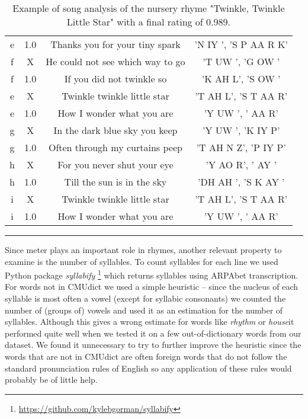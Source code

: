 \begin{table}[h!]
\begin{tabular}{c|c|c|c}
	e  & 1.0  & Thanks you for your tiny spark &  'N IY ', 'S P AA R K' \\
	f  & X    & He could not see which way to go &  'T UW ', 'G OW ' \\
	f  & 1.0  & If you did not twinkle so & 'K AH L', 'S OW ' \\
	e  & X    & Twinkle twinkle little star &  'T AH L', 'S T AA R' \\
	e  & 1.0  & How I wonder what you are &  'Y UW ', ' AA R' \\[0.5ex]
	\hline
	g  & X    & In the dark blue sky you keep & 'Y UW ', 'K IY P' \\
	g  & 1.0  & Often through my curtains peep &  'T AH N Z', 'P IY P' \\
	h  & X    & For you never shut your eye &  'Y AO R', ' AY ' \\
	h  & 1.0  & Till the sun is in the sky & 'DH AH ', 'S K AY ' \\
	i  & X    & Twinkle twinkle little star & 'T AH L', 'S T AA R' \\
	i  & 1.0  & How I wonder what you are &  'Y UW ', ' AA R' \\
	\end{tabular}
	\caption{Example of song analysis of the nursery rhyme "Twinkle, Twinkle Little Star" with a final rating of 0.989.}
	\label{twinkle_analysis_table}
\end{table}


	
\noindent\rule{14cm}{0.4pt}

Since meter plays an important role in rhymes, another relevant property to examine is the number of syllables. To count syllables for each line we used Python package \textit{syllabify} \footnote{\url{https://github.com/kylebgorman/syllabify}} which returns syllables using ARPAbet transcription. For words not in CMUdict we used a simple heuristic -- since the nucleus of each syllable is most often a vowel (except for syllabic consonants) we counted the number of (groups of) vowels and used it as an estimation for the number of syllables. Although this gives a wrong estimate for words like \textit{rhythm} or \textit{house}it performed quite well when we tested it on a few out-of-dictionary words from our dataset. We found it unnecessary to try to further improve the heuristic since the words that are not in CMUdict are often foreign words that do not follow the standard pronunciation rules of English so any application of these rules would probably be of little help.

